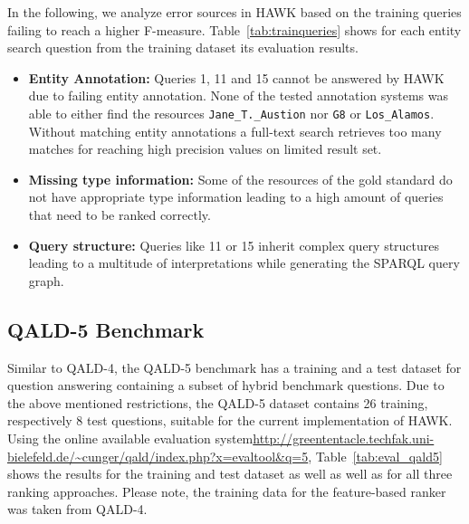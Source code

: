 In the following, we analyze error sources in HAWK based on the training queries failing to reach a higher F-measure.
Table~\ref{tab:trainqueries} shows for each entity search question from the training dataset its evaluation results.
\begin{itemize}
\item \textbf{Entity Annotation: } Queries 1, 11 and 15 cannot be answered by HAWK due to failing entity annotation. None of the tested annotation systems was able to either find the resources  \texttt{Jane\_T.\_Austion} nor \texttt{G8} or \texttt{Los\_Alamos}. 
Without matching entity annotations a full-text search retrieves too many matches for reaching high precision values on limited result set.
\item \textbf{Missing type information:} Some of the resources of the gold standard do not have appropriate type information leading to a high amount of queries that need to be ranked correctly.
\item \textbf{Query structure: } Queries like 11 or 15 inherit complex query structures leading to a multitude of interpretations while generating the SPARQL query graph.
\end{itemize}




\subsection{QALD-5 Benchmark}
Similar to QALD-4, the \ac{QALD}-5 benchmark has a training and a test dataset for question answering containing a subset of hybrid benchmark questions.
Due to the above mentioned restrictions, the \ac{QALD}-5 dataset contains 26 training, respectively 8 test questions, suitable for the current implementation of HAWK.
Using the online available evaluation system{\url{http://greententacle.techfak.uni-bielefeld.de/~cunger/qald/index.php?x=evaltool&q=5}}, Table~\ref{tab:eval_qald5} shows the results for the training and test dataset as well as well as for all three ranking approaches.
Please note, the training data  for the feature-based ranker was taken from \ac{QALD}-4.
\begin{table}[htb!]
\centering
{}
\caption{Results of \ac{QALD}-5 for different ranking methods. Number in brackets show the amount of generated answers, i.e., HAWK outputs at least one result set.}
\label{tab:eval_qald5}
\end{table}



